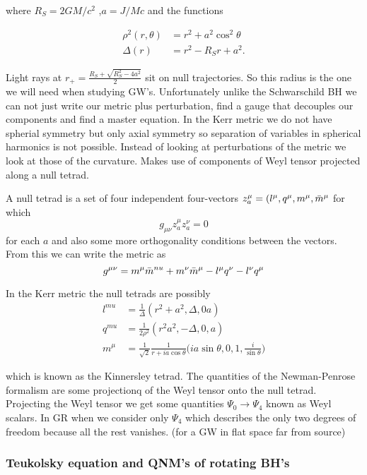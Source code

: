 \documentclass[12 pt]{article}
\begin{document}
where $R_S = 2GM/c^2$ ,$a = J/Mc$ and the functions 

\begin{align}
	\rho^2(r,\theta) &= r^2 +a^2 \cos^2 \theta \\
	\Delta(r) &= r^2 - R_S r + a^2.
\end{align}

Light rays at $r_+ = \frac{R_S +\sqrt{R_S^2 - 4a^2}}{2} $ sit on null trajectories. So this radius is the one we will need when studying GW's.
Unfortunately unlike the Schwarschild BH we can not just write our metric plus perturbation, find a gauge that decouples our components and find a master equation. In the Kerr metric we do not have spherial symmetry but only axial symmetry so separation of variables in spherical harmonics is not possible. Instead of looking at perturbations of the metric we look at those of the curvature. Makes use of components of Weyl tensor projected along a null tetrad.

A null tetrad is a set of four independent four-vectors $z_a^{\mu} = (l^{\mu}, q^{\mu},m^{\mu},\Bar{m}^{\mu}$ for which 
\begin{equation}
	g_{\mu \nu}z_a^{\mu}z_a^{\nu} = 0
\end{equation}
for each $a$ and also some more orthogonality conditions between the vectors. From this we can write the metric as
\begin{equation}
	g^{\mu \nu} = m^{\mu} \Bar{m}^{nu} + m^{\nu} \Bar{m}^{\mu} - l^{\mu} q^{\nu} - l^{\nu} q^{\mu}
\end{equation}

In the Kerr metric the null tetrads are possibly
\begin{align}
	l^{mu} &= \frac{1}{\Delta}  (r^2 +a^2, \Delta ,0 a) \\
	q^{mu} &= \frac{1}{2\rho^2}  (r^2 a^2, -\Delta, 0,a) \\
	m^{\mu} &= \frac{1}{\sqrt{2}} \frac{1}{r+i a \cos \theta}\Big( ia \sin \theta,0,1,\frac{i}{\sin \theta} \Big)
\end{align}

which is known as the Kinnersley tetrad. The quantities of the Newman-Penrose formalism are some projectionq of the Weyl tensor onto the null tetrad. Projecting the Weyl tensor we get some quantities $\Psi_0 \longrightarrow \Psi_4$ known as Weyl scalars. In GR when we consider only $\Psi_4$ which describes the only two degrees of freedom because all the rest vanishes. (for a GW in flat space far from source)

\subsubsection{Teukolsky equation and QNM's of rotating BH's}
\end{document}
